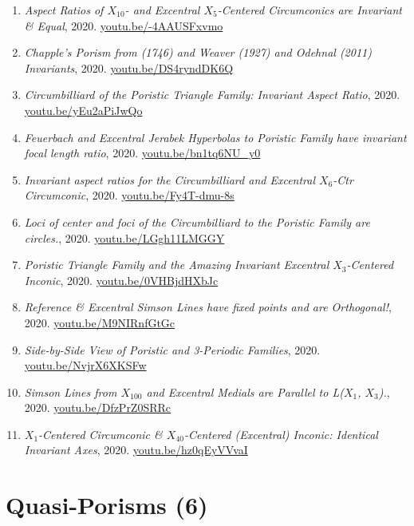 \documentclass[12pt]{article}
\begin{document}
\begin{enumerate}[resume]
\item \textit{Aspect Ratios of $X_{10}$- and Excentral $X_{5}$-Centered Circumconics are Invariant \& Equal}, 2020. \href{https://youtu.be/-4AAUSFxvmo}{\url{youtu.be/-4AAUSFxvmo}}
\item \textit{Chapple's Porism from (1746) and Weaver (1927) and Odehnal (2011) Invariants}, 2020. \href{https://youtu.be/DS4ryndDK6Q}{\url{youtu.be/DS4ryndDK6Q}}
\item \textit{Circumbilliard of the Poristic Triangle Family: Invariant Aspect Ratio}, 2020. \href{https://youtu.be/yEu2aPiJwQo}{\url{youtu.be/yEu2aPiJwQo}}
\item \textit{Feuerbach and Excentral Jerabek Hyperbolas to Poristic Family have invariant focal length ratio}, 2020. \href{https://youtu.be/bn1tq6NU_y0}{\url{youtu.be/bn1tq6NU\_y0}}
\item \textit{Invariant aspect ratios for the Circumbilliard and Excentral $X_{6}$-Ctr Circumconic}, 2020. \href{https://youtu.be/Fy4T-dmu-8s}{\url{youtu.be/Fy4T-dmu-8s}}
\item \textit{Loci of center and foci of the Circumbilliard to the Poristic Family are circles.}, 2020. \href{https://youtu.be/LGgh11LMGGY}{\url{youtu.be/LGgh11LMGGY}}
\item \textit{Poristic Triangle Family and the Amazing Invariant Excentral $X_{3}$-Centered Inconic}, 2020. \href{https://youtu.be/0VHBjdHXbJc}{\url{youtu.be/0VHBjdHXbJc}}
\item \textit{Reference \& Excentral Simson Lines have fixed points and are Orthogonal!}, 2020. \href{https://youtu.be/M9NIRnfGtGc}{\url{youtu.be/M9NIRnfGtGc}}
\item \textit{Side-by-Side View of Poristic and 3-Periodic Families}, 2020. \href{https://youtu.be/NvjrX6XKSFw}{\url{youtu.be/NvjrX6XKSFw}}
\item \textit{Simson Lines from $X_{100}$ and Excentral Medials are Parallel to L($X_{1}$, $X_{3}$).}, 2020. \href{https://youtu.be/DfzPrZ0SRRc}{\url{youtu.be/DfzPrZ0SRRc}}
\item \textit{$X_{1}$-Centered Circumconic \& $X_{40}$-Centered (Excentral) Inconic: Identical Invariant Axes}, 2020. \href{https://youtu.be/hz0qEyVVvaI}{\url{youtu.be/hz0qEyVVvaI}}
\end{enumerate}

\section{Quasi-Porisms (6)}
\end{document}
